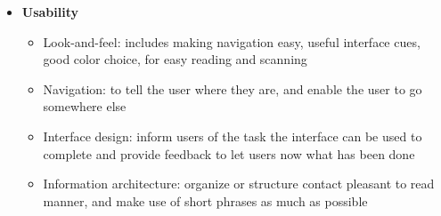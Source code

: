 \begin{itemize}
\begin{itemize}
		\end{itemize}
	\item \textbf{Usability}
		\begin{itemize}
			\item Look-and-feel: includes making navigation easy, useful interface cues, good color choice, for easy reading and scanning 
			\item Navigation: to tell the user where they are, and enable the user to go somewhere else
			\item Interface design: inform users of the task the interface can be used to complete and provide feedback to let users now what has been done
			\item Information architecture: organize or structure contact pleasant to read manner, and make use of short phrases as much as possible
		\end{itemize}
\end{itemize}

%